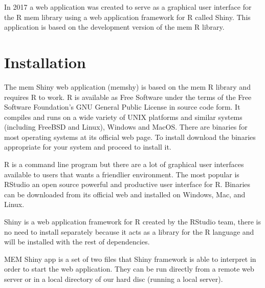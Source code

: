\documentclass[10pt,a4paper]{memoir}
\begin{document}
In 2017 a web application was created to serve as a graphical user interface for the R mem library using a web application framework for R called Shiny. This application is based on the development version of the mem R library.

\chapter{Installation}

The mem Shiny web application (memshy) is based on the mem R library and requires R to work. R is available as Free Software under the terms of the Free Software Foundation’s GNU General Public License in source code form. It compiles and runs on a wide variety of UNIX platforms and similar systems (including FreeBSD and Linux), Windows and MacOS. There are binaries for most operating systems at its official web page\citep{the_r_foundation_r_nodate}. To install download the binaries appropriate for your system and proceed to install it.

R is a command line program but there are a lot of graphical user interfaces available to users that wants a friendlier environment. The most popular is RStudio an open source powerful and productive user interface for R. Binaries can be downloaded from its official web\citep{rstudio_r_nodate} and installed on Windows, Mac, and Linux.

Shiny is a web application framework for R created by the RStudio team, there is no need to install separately because it acts as a library for the R language and will be installed with the rest of dependencies.

MEM Shiny app is a set of two files that Shiny framework is able to interpret in order to start the web application. They can be run directly from a remote web server or in a local directory of our hard disc (running a local server).

\medskip
 


\end{document}
